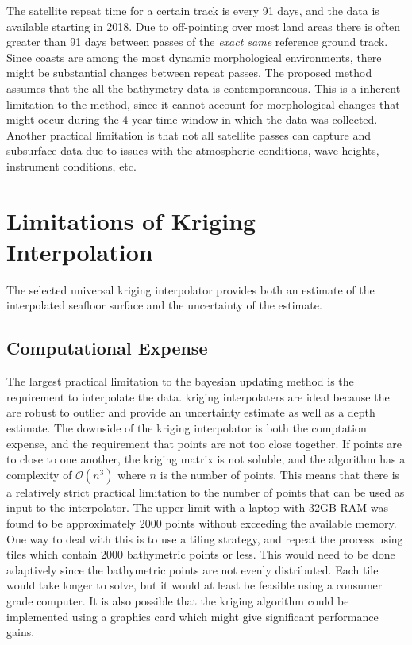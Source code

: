 The satellite repeat time for a certain track is every 91 days, and the data is available starting in 2018. Due to off-pointing over most land areas there is often greater than 91 days between passes of the \emph{exact same} reference ground track. Since coasts are among the most dynamic morphological environments, there might be substantial changes between repeat passes. The proposed method assumes that the all the bathymetry data is contemporaneous. This is a inherent limitation to the method, since it cannot account for morphological changes that might occur during the 4-year time window in which the data was collected. Another practical limitation is that not all satellite passes can capture and subsurface data due to issues with the atmospheric conditions, wave heights, instrument conditions, etc. 

\section{Limitations of Kriging Interpolation}

The selected universal kriging interpolator provides both an estimate of the interpolated seafloor surface and the uncertainty of the estimate.

\subsection{Computational Expense}

The largest practical limitation to the bayesian updating method is the requirement to interpolate the data. kriging interpolaters are ideal because the are robust to outlier and provide an uncertainty estimate as well as a depth estimate. The downside of the kriging interpolator is both the comptation expense, and the requirement that points are not too close together. If points are to close to one another, the kriging matrix is not soluble, and the algorithm has a complexity of $\mathcal{O}(n^3)$ where $n$ is the number of points. This means that there is a relatively strict practical limitation to the number of points that can be used as input to the interpolator. The upper limit with a laptop with 32GB RAM was found to be approximately 2000 points without exceeding the available memory. One way to deal with this is to use a tiling strategy, and repeat the process using tiles which contain 2000 bathymetric points or less. This would need to be done adaptively since the bathymetric points are not evenly distributed. Each tile would take longer to solve, but it would at least be feasible using a consumer grade computer. It is also possible that the kriging algorithm could be implemented using a graphics card which might give significant performance gains.

